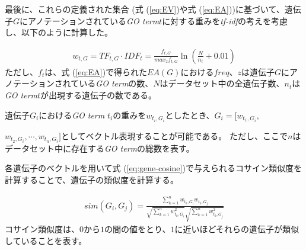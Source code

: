 \documentclass[titlepage,12pt]{jreport}
\begin{document}
最後に、これらの定義された集合 (式 (\ref{eq:EV})や式 (\ref{eq:EA}))に基づいて、遺伝子$G$にアノテーションされている{\it GO term}$t$に対する重みを{\it tf-idf}の考えを考慮し、以下のように計算した。

\begin{eqnarray}
	w_{t,G} = TF_{t,G} \cdot IDF_{t} = \frac{f_{t, G}}{max_{z}f_{t,G}} \ln(\frac{N}{n_t} + 0.01)
\end{eqnarray}
ただし、$f_t$は、式 (\ref{eq:EA})で得られた$EA(G)$における$freq$、$z$は遺伝子$G$にアノテーションされている{\it GO term}の数、$N$はデータセット中の全遺伝子数、$n_t$は{\it GO term}$t$が出現する遺伝子の数である。

遺伝子$G_i$における{\it GO term} $t_i$の重みを$w_{t_i,G_i}$としたとき、$G_i = [w_{t_1, G_i}, $ \par $w_{t_2, G_i}, \cdots, w_{t_n, G_i}]$としてベクトル表現することが可能である。 ただし、ここで$n$はデータセット中に存在する{\it GO term}の総数を表す。

各遺伝子のベクトルを用いて式 (\ref{eq:gene-cosine})で与えられるコサイン類似度を計算することで、遺伝子の類似度を計算する。

\begin{eqnarray}
	sim(G_i, G_j) = \frac{\sum_{k = 1}^{n}w_{t_k, G_i}w_{t_k, G_j}}{\sqrt{\sum_{k = 1}^{n}w^{2}_{t_k, G_i}}\sqrt{\sum_{k = 1}^{n}w^{2}_{t_k, G_j}}}
	\label{eq:gene-cosine}
\end{eqnarray}
コサイン類似度は、$0$から$1$の間の値をとり、$1$に近いほどそれらの遺伝子が類似していることを表す。
\end{document}
